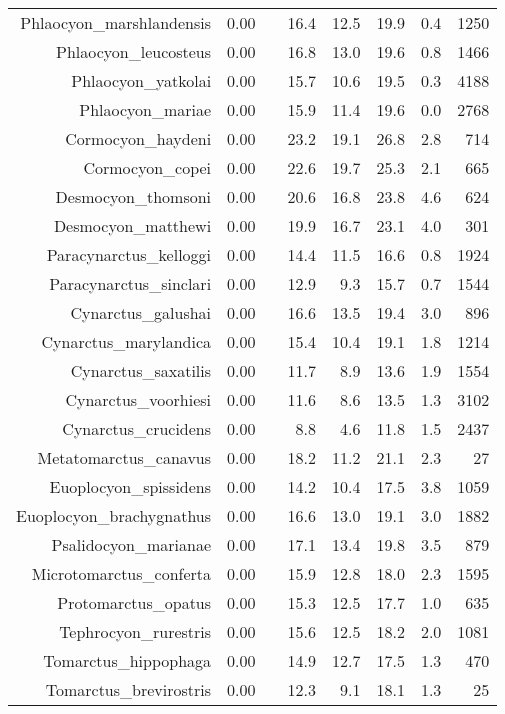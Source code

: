 \begin{table}[ht]
\begin{tabular}{rrrrrrrr}
  Phlaocyon\_marshlandensis & 0.00 &  & 16.4 & 12.5 & 19.9 & 0.4 & 1250 \\ 
  Phlaocyon\_leucosteus & 0.00 &  & 16.8 & 13.0 & 19.6 & 0.8 & 1466 \\ 
  Phlaocyon\_yatkolai & 0.00 &  & 15.7 & 10.6 & 19.5 & 0.3 & 4188 \\ 
  Phlaocyon\_mariae & 0.00 &  & 15.9 & 11.4 & 19.6 & 0.0 & 2768 \\ 
  Cormocyon\_haydeni & 0.00 &  & 23.2 & 19.1 & 26.8 & 2.8 & 714 \\ 
  Cormocyon\_copei & 0.00 &  & 22.6 & 19.7 & 25.3 & 2.1 & 665 \\ 
  Desmocyon\_thomsoni & 0.00 &  & 20.6 & 16.8 & 23.8 & 4.6 & 624 \\ 
  Desmocyon\_matthewi & 0.00 &  & 19.9 & 16.7 & 23.1 & 4.0 & 301 \\ 
  Paracynarctus\_kelloggi & 0.00 &  & 14.4 & 11.5 & 16.6 & 0.8 & 1924 \\ 
  Paracynarctus\_sinclari & 0.00 &  & 12.9 & 9.3 & 15.7 & 0.7 & 1544 \\ 
  Cynarctus\_galushai & 0.00 &  & 16.6 & 13.5 & 19.4 & 3.0 & 896 \\ 
  Cynarctus\_marylandica & 0.00 &  & 15.4 & 10.4 & 19.1 & 1.8 & 1214 \\ 
  Cynarctus\_saxatilis & 0.00 &  & 11.7 & 8.9 & 13.6 & 1.9 & 1554 \\ 
  Cynarctus\_voorhiesi & 0.00 &  & 11.6 & 8.6 & 13.5 & 1.3 & 3102 \\ 
  Cynarctus\_crucidens & 0.00 &  & 8.8 & 4.6 & 11.8 & 1.5 & 2437 \\ 
  Metatomarctus\_canavus & 0.00 &  & 18.2 & 11.2 & 21.1 & 2.3 & 27 \\ 
  Euoplocyon\_spissidens & 0.00 &  & 14.2 & 10.4 & 17.5 & 3.8 & 1059 \\ 
  Euoplocyon\_brachygnathus & 0.00 &  & 16.6 & 13.0 & 19.1 & 3.0 & 1882 \\ 
  Psalidocyon\_marianae & 0.00 &  & 17.1 & 13.4 & 19.8 & 3.5 & 879 \\ 
  Microtomarctus\_conferta & 0.00 &  & 15.9 & 12.8 & 18.0 & 2.3 & 1595 \\ 
  Protomarctus\_opatus & 0.00 &  & 15.3 & 12.5 & 17.7 & 1.0 & 635 \\ 
  Tephrocyon\_rurestris & 0.00 &  & 15.6 & 12.5 & 18.2 & 2.0 & 1081 \\ 
  Tomarctus\_hippophaga & 0.00 &  & 14.9 & 12.7 & 17.5 & 1.3 & 470 \\ 
  Tomarctus\_brevirostris & 0.00 &  & 12.3 & 9.1 & 18.1 & 1.3 & 25 \\ 

\end{tabular}
\end{table}
